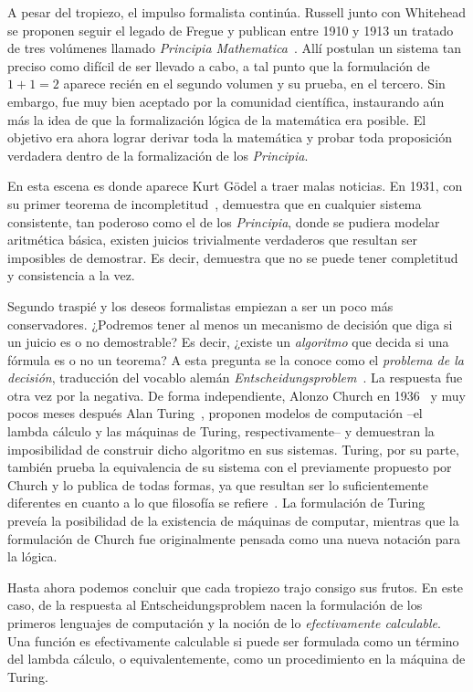 A pesar del tropiezo, el impulso formalista continúa. Russell junto con Whitehead se proponen seguir el legado de Fregue y publican entre 1910 y 1913 un tratado de tres volúmenes llamado {\it Principia Mathematica}~. Allí postulan un sistema tan preciso como difícil de ser llevado a cabo, a tal punto que la formulación de $1 + 1 = 2$ aparece recién en el segundo volumen y su prueba, en el tercero. Sin embargo, fue muy bien aceptado por la comunidad científica, instaurando aún más la idea de que la formalización lógica de la matemática era posible. El objetivo era ahora lograr derivar toda la matemática y probar toda proposición verdadera dentro de la formalización de los {\it Principia}.

En esta escena es donde aparece Kurt Gödel a traer malas noticias. En 1931, con su primer teorema de incompletitud~, demuestra que en cualquier sistema consistente, tan poderoso como el de los {\it Principia}, donde se pudiera modelar aritmética básica, existen juicios trivialmente verdaderos que resultan ser imposibles de demostrar. Es decir, demuestra que no se puede tener completitud y consistencia a la vez.

Segundo traspié y los deseos formalistas empiezan a ser un poco más conservadores. ¿Podremos tener al menos un mecanismo de decisión que diga si un juicio es o no demostrable? Es decir, ¿existe un {\it algoritmo} que decida si una fórmula es o no un teorema? A esta pregunta se la conoce como el {\it problema de la decisión}, traducción del vocablo alemán {\it Entscheidungsproblem}~. La respuesta fue otra vez por la negativa. De forma independiente, Alonzo Church en 1936~ y muy pocos meses después Alan Turing~, proponen modelos de computación --el lambda cálculo y las máquinas de Turing, respectivamente-- y demuestran la imposibilidad de construir dicho algoritmo en sus sistemas. Turing, por su parte, también prueba la equivalencia de su sistema con el previamente propuesto por Church y lo publica de todas formas, ya que resultan ser lo suficientemente diferentes en cuanto a lo que filosofía se refiere~. La formulación de Turing preveía la posibilidad de la existencia de máquinas de computar, mientras que la formulación de Church fue originalmente pensada como una nueva notación para la lógica.

Hasta ahora podemos concluir que cada tropiezo trajo consigo sus frutos. En este caso, de la respuesta al Entscheidungsproblem nacen la formulación de los primeros lenguajes de computación y la noción de lo {\it efectivamente calculable}. Una función es efectivamente calculable si puede ser formulada como un término del lambda cálculo, o equivalentemente, como un procedimiento en la máquina de Turing.

